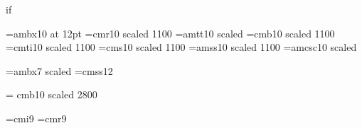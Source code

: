 {\begin{\parsearg\beginxxx}

\def\flagtrue{true}
\def\flagfalse{false}

\def\setflag{\parsearg\setflagxxx}
\def\setflagxxx #1{\expandafter\let\csname F#1\endcsname=\flagtrue}

\def\clearflag{\parsearg\clearflagxxx}
\def\clearflagxxx #1{\expandafter\let\csname F#1\endcsname=\flagfalse}

\def\defaultsetflag{\parsearg\defaultsetflagxxx}
\def\defaultsetflagxxx #1{%
\expandafter\ifx\csname F#1\endcsname\relax
\expandafter\let\csname F#1\endcsname=\flagtrue
\fi}

\def\ifset{\parsearg\ifsetxxx}

\def\ifsetxxx #1{%
\expandafter\ifx\csname F#1\endcsname\flagtrue \let\next=\relax \else
\let\next=\iffails \fi \next}

\def\ifnotset{\parsearg\ifnotsetxxx}
\def\ifclear{\parsearg\ifnotsetxxx}

\def\ifnotsetxxx #1{%
\expandafter\ifx\csname F#1\endcsname\flagtrue \let\next=\iffails \else
\let\next=\relax \fi \next}

\def\iffails #1\end if{}
\def\Eif{}

\font\btwelve=ambx10 at 12pt
\font\tenrm=cmr10 scaled 1100
\font\tentt=amtt10 scaled \magstephalf
\font\tenbf=cmb10 scaled 1100
\font\tenit=cmti10 scaled 1100
\font\tensl=cms10 scaled 1100
\font\tensf=amss10 scaled 1100
\def\li{\sf}
\font\tensc=amcsc10 scaled \magstephalf

\font{}=ambx7 scaled 
\let\deftt=\tentt
\font\twelvesf=cmss12

\font\titlerm = cmb10 scaled 2800

\font\indit=cmi9 \font\indrm=cmr9
\def\indbf{\indrm} \def\indsl{\indit}
\def\indexfonts{\let\it=\indit \let\sl=\indsl \let\bf=\indbf \let\rm=\indrm}


\end{\parsearg\beginxxx}}
